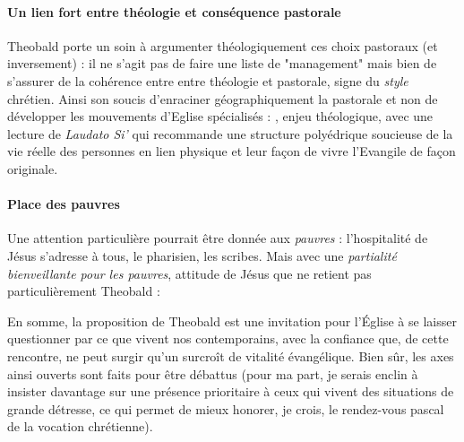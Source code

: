 \paragraph{Un lien fort entre théologie et conséquence pastorale} Theobald porte un soin à argumenter théologiquement ces choix pastoraux (et inversement) : il ne s'agit pas de faire une liste de "management" mais bien de s'assurer de la cohérence entre entre théologie et pastorale, signe du \textit{style} chrétien. Ainsi
son soucis d'enraciner géographiquement la pastorale et non de développer les mouvements d'Eglise spécialisés : , enjeu théologique, avec une lecture de \textit{Laudato Si'} qui recommande une structure polyédrique soucieuse de la vie réelle des personnes en lien physique et leur façon de vivre l'Evangile de façon originale.

\paragraph{Place des pauvres} Une attention particulière pourrait être donnée aux \textit{pauvres} : l'hospitalité de Jésus s'adresse à tous, le pharisien, les scribes. Mais avec une \textit{partialité bienveillante pour les pauvres}, attitude de Jésus que ne retient pas particulièrement Theobald :  
\begin{singlequote}
    En somme, la proposition de Theobald est une invitation pour l’Église à se laisser questionner par ce que vivent nos contemporains, avec la confiance que, de cette rencontre, ne peut surgir qu’un surcroît de vitalité évangélique. Bien sûr, les axes ainsi ouverts sont faits pour être débattus (pour ma part, je serais enclin à insister davantage sur une présence prioritaire à ceux qui vivent des situations de grande détresse, ce qui permet de mieux honorer, je crois, le rendez-vous pascal de la vocation chrétienne).\cite{etienne_grieu_leglise_nodate}

\end{singlequote}

 
 




